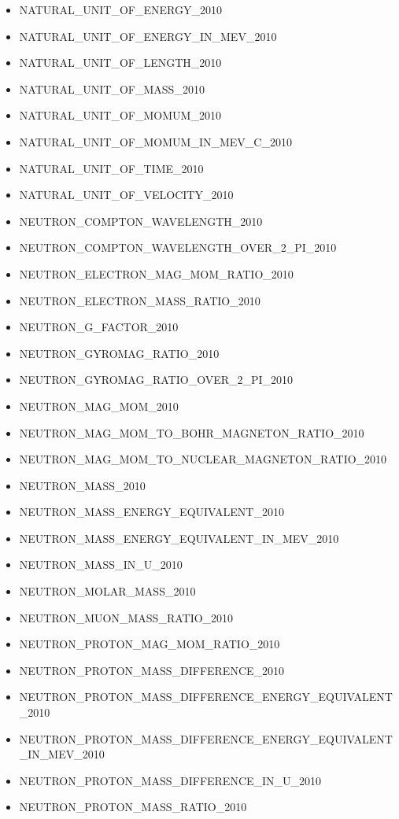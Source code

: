 \begin{itemize}
  NATURAL\_UNIT\_OF\_ACTION\_IN\_EV\_S\_2010
\item
  NATURAL\_UNIT\_OF\_ENERGY\_2010
\item
  NATURAL\_UNIT\_OF\_ENERGY\_IN\_MEV\_2010
\item
  NATURAL\_UNIT\_OF\_LENGTH\_2010
\item
  NATURAL\_UNIT\_OF\_MASS\_2010
\item
  NATURAL\_UNIT\_OF\_MOMUM\_2010
\item
  NATURAL\_UNIT\_OF\_MOMUM\_IN\_MEV\_C\_2010
\item
  NATURAL\_UNIT\_OF\_TIME\_2010
\item
  NATURAL\_UNIT\_OF\_VELOCITY\_2010
\item
  NEUTRON\_COMPTON\_WAVELENGTH\_2010
\item
  NEUTRON\_COMPTON\_WAVELENGTH\_OVER\_2\_PI\_2010
\item
  NEUTRON\_ELECTRON\_MAG\_MOM\_RATIO\_2010
\item
  NEUTRON\_ELECTRON\_MASS\_RATIO\_2010
\item
  NEUTRON\_G\_FACTOR\_2010
\item
  NEUTRON\_GYROMAG\_RATIO\_2010
\item
  NEUTRON\_GYROMAG\_RATIO\_OVER\_2\_PI\_2010
\item
  NEUTRON\_MAG\_MOM\_2010
\item
  NEUTRON\_MAG\_MOM\_TO\_BOHR\_MAGNETON\_RATIO\_2010
\item
  NEUTRON\_MAG\_MOM\_TO\_NUCLEAR\_MAGNETON\_RATIO\_2010
\item
  NEUTRON\_MASS\_2010
\item
  NEUTRON\_MASS\_ENERGY\_EQUIVALENT\_2010
\item
  NEUTRON\_MASS\_ENERGY\_EQUIVALENT\_IN\_MEV\_2010
\item
  NEUTRON\_MASS\_IN\_U\_2010
\item
  NEUTRON\_MOLAR\_MASS\_2010
\item
  NEUTRON\_MUON\_MASS\_RATIO\_2010
\item
  NEUTRON\_PROTON\_MAG\_MOM\_RATIO\_2010
\item
  NEUTRON\_PROTON\_MASS\_DIFFERENCE\_2010
\item
  NEUTRON\_PROTON\_MASS\_DIFFERENCE\_ENERGY\_EQUIVALENT\_2010
\item
  NEUTRON\_PROTON\_MASS\_DIFFERENCE\_ENERGY\_EQUIVALENT\_IN\_MEV\_2010
\item
  NEUTRON\_PROTON\_MASS\_DIFFERENCE\_IN\_U\_2010
\item
  NEUTRON\_PROTON\_MASS\_RATIO\_2010

\end{itemize}

